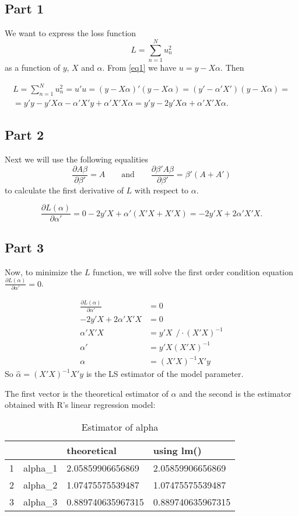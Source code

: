 \documentclass[12pt, a4paper]{article}\usepackage[]{graphicx}\usepackage[]{color}
\begin{document}
\subsection{Part 1}
We want to express the loss function 
\[ L = \sum_{n=1}^{N} u_n^2 \]
as a function of $y$, $X$ and $\alpha$. From \eqref{eq1} we have $u=y-X\alpha$. Then

\begin{gather*} 
L = \sum_{n=1}^{N} u_n^2 = u' u = (y-X\alpha)' (y-X\alpha) = (y'-\alpha' X')(y-X\alpha) = \\
= y'y - y'X\alpha - \alpha'X'y + \alpha'X'X\alpha = y'y - 2y'X\alpha + \alpha'X'X\alpha.
\end{gather*}


\subsection{Part 2}
Next we will use the following equalities
\[ \frac{\partial A\beta}{\partial \beta'} = A \qquad \text{and} \qquad  \frac{\partial \beta' A\beta}{\partial \beta'} = \beta'(A+A')\]
to calculate the first derivative of $L$ with respect to $\alpha$.

\[ \frac{\partial L(\alpha)}{\partial \alpha'} = 0 - 2y'X + \alpha'(X'X + X'X) = - 2y'X +2 \alpha'X'X. \]


\subsection{Part 3} \label{referencja}
Now, to minimize the $L$ function, we will solve the first order condition equation $\frac{\partial L(\alpha)}{\partial \alpha'} = 0 $.

\begin{align*}
\frac{\partial L(\alpha)}{\partial \alpha'} & = 0 \\
-2 y'X + 2 \alpha'X'X  & = 0 \\
\alpha'X'X & = y'X \ \ /\cdot (X'X)^{-1} \\
\alpha' & = y'X (X'X)^{-1} \\
\alpha & = (X'X)^{-1} X'y
\end{align*}
So $\hat{\alpha}  = (X'X)^{-1} X'y$ is the LS estimator of the model parameter.

The first vector is the theoretical estimator of $\alpha$ and the second is the estimator obtained with R's linear regression model:
\begin{table}[H]
\centering
\begin{tabular}{rlll}
  \hline
 &   & theoretical & using lm() \\ 
  \hline
1 & alpha\_1 & 2.05859906656869 & 2.05859906656869 \\ 
  2 & alpha\_2 & 1.07475575539487 & 1.07475575539487 \\ 
  3 & alpha\_3 & 0.889740635967315 & 0.889740635967315 \\ 
   \hline
\end{tabular}
\caption{Estimator of alpha} 
\label{tab:alpha.est}
\end{table}
\end{document}
